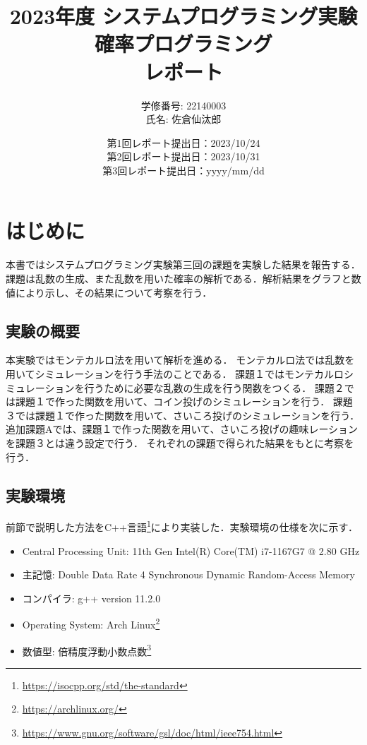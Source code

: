 \documentclass[fleqn, a4paper. 12pt]{ltjsarticle} %
\title{
2023年度 システムプログラミング実験\\
確率プログラミング\\
レポート}
\author{
学修番号: 22140003 \\
氏名: 佐倉仙汰郎 \\
}
\begin{document}
\date{
第1回レポート提出日：2023/10/24 \\
第2回レポート提出日：2023/10/31 \\
第3回レポート提出日：yyyy/mm/dd \\
}
\maketitle

\section*{はじめに}
本書ではシステムプログラミング実験第三回の課題を実験した結果を報告する．課題は乱数の生成、また乱数を用いた確率の解析である．解析結果をグラフと数値により示し、その結果について考察を行う．
\subsection*{実験の概要}

本実験ではモンテカルロ法を用いて解析を進める．
モンテカルロ法では乱数を用いてシミュレーションを行う手法のことである．
課題１ではモンテカルロシミュレーションを行うために必要な乱数の生成を行う関数をつくる．
課題２では課題１で作った関数を用いて、コイン投げのシミュレーションを行う．
課題３では課題１で作った関数を用いて、さいころ投げのシミュレーションを行う．
追加課題Aでは、課題１で作った関数を用いて、さいころ投げの趣味レーションを課題３とは違う設定で行う．
それぞれの課題で得られた結果をもとに考察を行う．

\subsection*{実験環境}
前節で説明した方法をC++言語\footnote{\url{https://isocpp.org/std/the-standard}}により実装した．実験環境の仕様を次に示す．
\begin{itemize}
    \item Central Processing Unit: 11th Gen Intel(R) Core(TM) i7-1167G7 @ 2.80 GHz
    \item 主記憶: Double Data Rate 4 Synchronous Dynamic Random-Access Memory
    \item コンパイラ: g++ version 11.2.0
    \item Operating System: Arch Linux\footnote{\url{https://archlinux.org/}}
    \item 数値型: 倍精度浮動小数点数\footnote{\url{https://www.gnu.org/software/gsl/doc/html/ieee754.html}}
  \end{itemize}
\newpage
\end{document}
